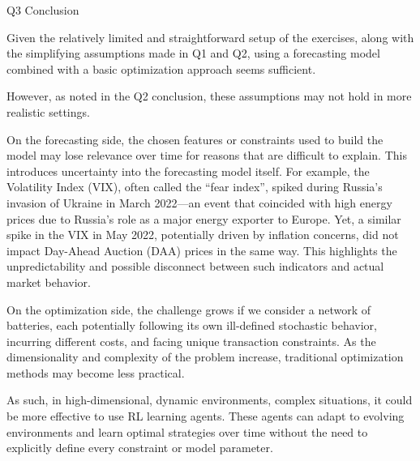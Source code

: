 \documentclass[11pt]{article}
\makeatletter
\newcommand{\boxspacing}{\kern\kvtcb@left@rule\kern\kvtcb@boxsep}
\newcommand{\prompt}[4]{
        {\ttfamily\llap{{\color{#2}[#3]:\hspace{3pt}#4}}\vspace{-\baselineskip}}
    }
\makeatother
\begin{document}
    Q3 Conclusion

Given the relatively limited and straightforward setup of the exercises,
along with the simplifying assumptions made in Q1 and Q2, using a
forecasting model combined with a basic optimization approach seems
sufficient.

However, as noted in the Q2 conclusion, these assumptions may not hold
in more realistic settings.

On the forecasting side, the chosen features or constraints used to
build the model may lose relevance over time for reasons that are
difficult to explain. This introduces uncertainty into the forecasting
model itself. For example, the Volatility Index (VIX), often called the
``fear index'', spiked during Russia's invasion of Ukraine in March
2022---an event that coincided with high energy prices due to Russia's
role as a major energy exporter to Europe. Yet, a similar spike in the
VIX in May 2022, potentially driven by inflation concerns, did not
impact Day-Ahead Auction (DAA) prices in the same way. This highlights
the unpredictability and possible disconnect between such indicators and
actual market behavior.

On the optimization side, the challenge grows if we consider a network
of batteries, each potentially following its own ill-defined stochastic
behavior, incurring different costs, and facing unique transaction
constraints. As the dimensionality and complexity of the problem
increase, traditional optimization methods may become less practical.

As such, in high-dimensional, dynamic environments, complex situations,
it could be more effective to use RL learning agents. These agents can
adapt to evolving environments and learn optimal strategies over time
without the need to explicitly define every constraint or model
parameter.

    \begin{tcolorbox}[breakable, size=fbox, boxrule=1pt, pad at break*=1mm,colback=cellbackground, colframe=cellborder]
\prompt{In}{incolor}{ }{\boxspacing}
\begin{Verbatim}[commandchars=\\\{\}]

\end{Verbatim}
\end{tcolorbox}


    
    
    
\end{document}
